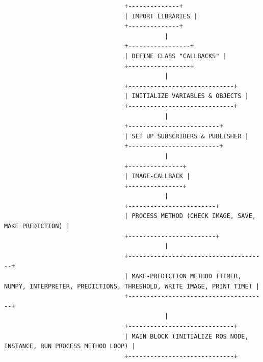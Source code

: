 \documentclass[11pt, a4paper, openany]{book}
\begin{document}
\begin{lstlisting}
                                 +--------------+
                                 | IMPORT LIBRARIES |
                                 +--------------+
                                            |
                                 +-----------------+
                                 | DEFINE CLASS "CALLBACKS" |
                                 +-----------------+
                                            |
                                 +-----------------------------+
                                 | INITIALIZE VARIABLES & OBJECTS |
                                 +-----------------------------+
                                            |
                                 +-------------------------+
                                 | SET UP SUBSCRIBERS & PUBLISHER |
                                 +-------------------------+
                                            |
                                 +---------------+
                                 | IMAGE-CALLBACK |
                                 +---------------+
                                            |
                                 +------------------------+
                                 | PROCESS METHOD (CHECK IMAGE, SAVE, MAKE PREDICTION) |
                                 +------------------------+
                                            |
                                 +--------------------------------------+
                                 | MAKE-PREDICTION METHOD (TIMER, NUMPY, INTERPRETER, PREDICTIONS, THRESHOLD, WRITE IMAGE, PRINT TIME) |
                                 +--------------------------------------+
                                            |
                                 +-----------------------------+
                                 | MAIN BLOCK (INITIALIZE ROS NODE, INSTANCE, RUN PROCESS METHOD LOOP) |
                                 +-----------------------------+
\end{lstlisting}
\end{document}
